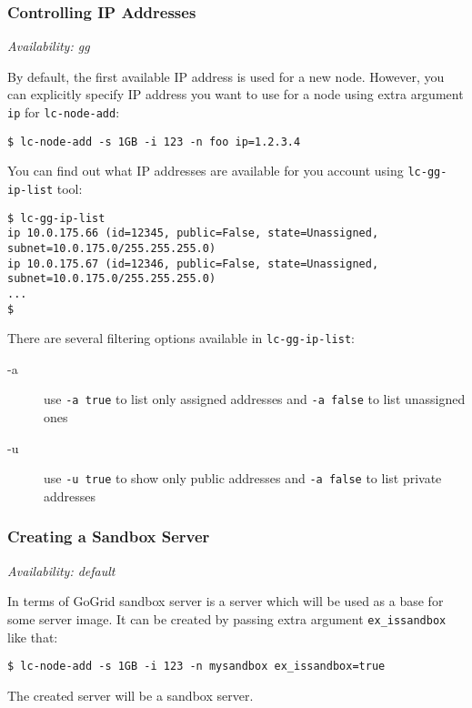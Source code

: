 \documentclass[a4paper]{report}
\begin{document}
\subsubsection{Controlling IP Addresses}

\textit{Availability: gg}

By default, the first available IP address is used for a new node. However, you
can explicitly specify IP address you want to use for a node using extra
argument {\tt ip} for \texttt{lc-node-add}:

\begin{verbatim}
$ lc-node-add -s 1GB -i 123 -n foo ip=1.2.3.4
\end{verbatim}

You can find out what IP addresses are available for you account using 
\texttt{lc-gg-ip-list} tool:

\begin{verbatim}
$ lc-gg-ip-list
ip 10.0.175.66 (id=12345, public=False, state=Unassigned, subnet=10.0.175.0/255.255.255.0)
ip 10.0.175.67 (id=12346, public=False, state=Unassigned, subnet=10.0.175.0/255.255.255.0)
...
$
\end{verbatim}

There are several filtering options available in \texttt{lc-gg-ip-list}:

\begin{description}
  \item[-a] use \texttt{-a true} to list only assigned addresses and
       \texttt{-a false} to list unassigned ones
  \item[-u] use \texttt{-u true} to show only public addresses and
       \texttt{-a false} to list private addresses
\end{description}

\subsubsection{Creating a Sandbox Server}

\textit{Availability: default}

In terms of GoGrid sandbox server is a server which will be used as a base for
some server image. It can be created by passing extra argument {\tt ex\_issandbox}
like that:

\begin{verbatim}
$ lc-node-add -s 1GB -i 123 -n mysandbox ex_issandbox=true
\end{verbatim}


The created server will be a sandbox server.
\end{document}

